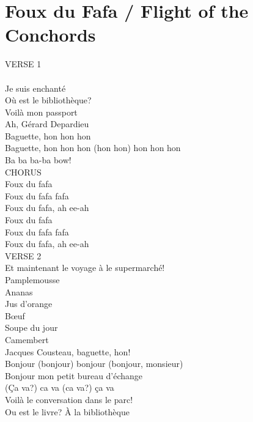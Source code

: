 \section{Foux du Fafa / Flight of the Conchords}\label{ch:fouxdufafa}
\AmajorSeven
\DminorA
\Dseven
VERSE 1\\
  \\
Je suis enchanté \\
Où est le bibliothèque?\\
Voilà mon passport\\
Ah, Gérard Depardieu\\
Baguette, hon hon hon\\
Baguette, hon hon hon (hon hon) hon hon hon\\
Ba ba ba-ba bow!\\
CHORUS\\
Foux du fafa\\
Foux du fafa fafa\\
Foux du fafa, ah ee-ah\\
Foux du fafa\\
Foux du fafa fafa\\
Foux du fafa, ah ee-ah\\
VERSE 2\\
Et maintenant le voyage à le supermarché!\\
Pamplemousse\\
Ananas \\
Jus d'orange \\
Bœuf \\
Soupe du jour\\
Camembert\\
Jacques Cousteau, baguette, hon!\\
Bonjour (bonjour) bonjour (bonjour, monsieur)\\
Bonjour mon petit bureau d'échange\\
(Ça  va?) ca va (ca va?) ça va\\
Voilà le  conversation dans le parc!\\
Ou est le livre? À la bibliothèque\\
